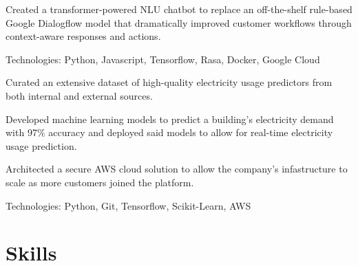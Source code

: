 \documentclass[]{deedy-resume-openfont}
\begin{document}
\qquad\qquad\qquad\qquad\qquad\qquad\qquad\qquad\quad{}
\begin{tightemize}
    \item Created a transformer-powered NLU chatbot to replace an 
    off-the-shelf rule-based Google Dialogflow model that dramatically 
    improved customer workflows through context-aware responses and actions.  
    \item Technologies: Python, Javascript, Tensorflow, Rasa, Docker, Google Cloud
    \end{tightemize}
\sectionsep

\qquad\qquad\qquad\qquad{}
\begin{tightemize}
\item Curated an extensive dataset of high-quality electricity usage predictors from
both internal and external sources.
\item Developed machine learning models to predict a building's electricity demand with 97\% 
accuracy and deployed said models to allow for real-time electricity usage prediction.
\item Architected a secure AWS cloud solution to allow the company's infastructure to scale 
as more customers joined the platform.
\item Technologies: Python, Git, Tensorflow, Scikit-Learn, AWS
\end{tightemize}


\section{Skills}
\vspace{-5pt}
\cvtag{\LaTeX}  


\end{document}
